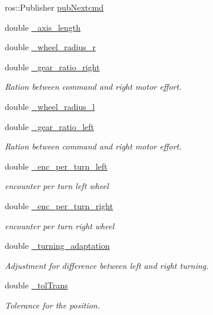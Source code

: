 \begin{DoxyCompactItemize}
ros\-::\-Publisher \hyperlink{classControl_a709f0421b317029ef691d15d18974179}{pub\-Nextcmd}
\item 
double \hyperlink{classControl_a52c40a20af6d88b0ba97b0abf006616b}{\-\_\-axis\-\_\-length}
\item 
double \hyperlink{classControl_a502e3555475215826fc7f9b64ec8e0b2}{\-\_\-wheel\-\_\-radius\-\_\-r}
\item 
double \hyperlink{classControl_a78d7fb070693640585e703bb6f626cd1}{\-\_\-gear\-\_\-ratio\-\_\-right}
\begin{DoxyCompactList}\small\item\em Ration between command and right motor effort. \end{DoxyCompactList}\item 
double \hyperlink{classControl_a754081ecec9e1e75fc6df94c22d9df3e}{\-\_\-wheel\-\_\-radius\-\_\-l}
\item 
double \hyperlink{classControl_ad8c978657de600386fc66f935859e095}{\-\_\-gear\-\_\-ratio\-\_\-left}
\begin{DoxyCompactList}\small\item\em Ration between command and right motor effort. \end{DoxyCompactList}\item 
double \hyperlink{classControl_acc9c73871491bc8ac005980ae81d9410}{\-\_\-enc\-\_\-per\-\_\-turn\-\_\-left}
\begin{DoxyCompactList}\small\item\em encounter per turn left wheel \end{DoxyCompactList}\item 
double \hyperlink{classControl_a9f09be60ba816c6c3fb91c47129d2cd1}{\-\_\-enc\-\_\-per\-\_\-turn\-\_\-right}
\begin{DoxyCompactList}\small\item\em encounter per turn right wheel \end{DoxyCompactList}\item 
double \hyperlink{classControl_abcfbef74fbe58b4c24efd11e1c7364f5}{\-\_\-turning\-\_\-adaptation}
\begin{DoxyCompactList}\small\item\em Adjustment for difference between left and right turning. \end{DoxyCompactList}\item 
double \hyperlink{classControl_a1807356ca5230aca9ccb77bf869f007a}{\-\_\-tol\-Trans}
\begin{DoxyCompactList}\small\item\em Tolerance for the position. \end{DoxyCompactList}\item 

\end{DoxyCompactItemize}
